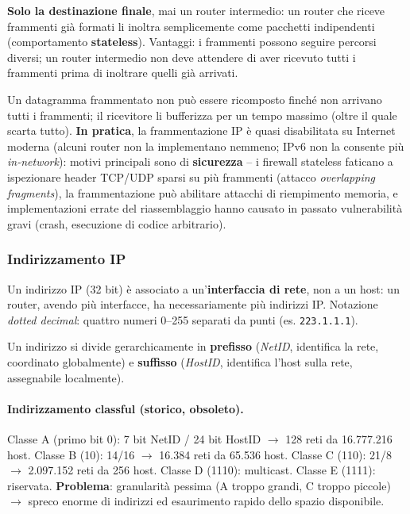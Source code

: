 \documentclass[12pt, a4paper]{article}
\begin{document}
\begin{tcolorbox}[colback=cyan!5, colframe=blue!40!black, title=\textbf{Chi riassembla i frammenti?}]
\textbf{Solo la destinazione finale}, mai un router intermedio: un router che riceve frammenti già formati li inoltra semplicemente come pacchetti indipendenti (comportamento \textbf{stateless}). Vantaggi: i frammenti possono seguire percorsi diversi; un router intermedio non deve attendere di aver ricevuto tutti i frammenti prima di inoltrare quelli già arrivati.
\end{tcolorbox}

Un datagramma frammentato non può essere ricomposto finché non arrivano tutti i frammenti; il ricevitore li bufferizza per un tempo massimo (oltre il quale scarta tutto). \textbf{In pratica}, la frammentazione IP è quasi disabilitata su Internet moderna (alcuni router non la implementano nemmeno; IPv6 non la consente più \textit{in-network}): motivi principali sono di \textbf{sicurezza} -- i firewall stateless faticano a ispezionare header TCP/UDP sparsi su più frammenti (attacco \textit{overlapping fragments}), la frammentazione può abilitare attacchi di riempimento memoria, e implementazioni errate del riassemblaggio hanno causato in passato vulnerabilità gravi (crash, esecuzione di codice arbitrario).

\subsubsection{Indirizzamento IP}

Un indirizzo IP (32 bit) è associato a un'\textbf{interfaccia di rete}, non a un host: un router, avendo più interfacce, ha necessariamente più indirizzi IP. Notazione \textit{dotted decimal}: quattro numeri 0--255 separati da punti (es. \texttt{223.1.1.1}).

Un indirizzo si divide gerarchicamente in \textbf{prefisso} (\textit{NetID}, identifica la rete, coordinato globalmente) e \textbf{suffisso} (\textit{HostID}, identifica l'host sulla rete, assegnabile localmente).

\paragraph{Indirizzamento classful (storico, obsoleto).} Classe A (primo bit 0): 7 bit NetID / 24 bit HostID $\to$ 128 reti da 16.777.216 host. Classe B (10): 14/16 $\to$ 16.384 reti da 65.536 host. Classe C (110): 21/8 $\to$ 2.097.152 reti da 256 host. Classe D (1110): multicast. Classe E (1111): riservata. \textbf{Problema}: granularità pessima (A troppo grandi, C troppo piccole) $\to$ spreco enorme di indirizzi ed esaurimento rapido dello spazio disponibile.
\end{document}
